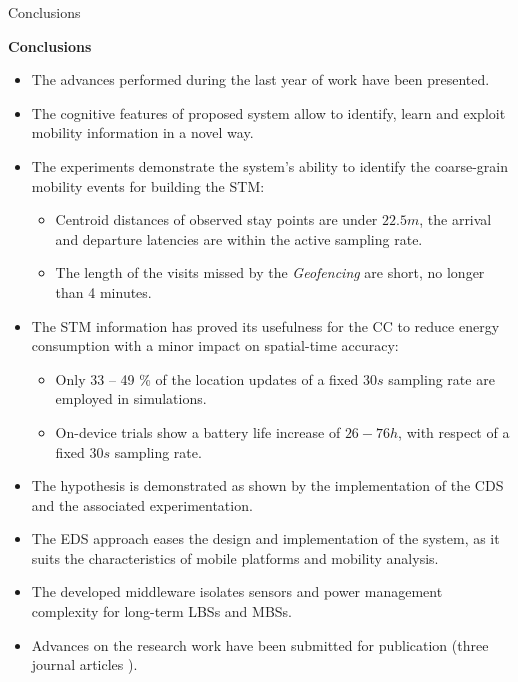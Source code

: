 \begin{frame}{Conclusions}{}
\small 
\begin{block}{\small \textbf{Conclusions}}
\begin{itemize}
  \item The advances performed during the last year of work have been presented.
  \item The cognitive features of proposed system allow to identify, learn and exploit mobility information in a novel way.

  \item The experiments demonstrate the system's ability to identify the coarse-grain mobility events for building the STM:
  \begin{itemize}
  	\item Centroid distances of observed stay points are under $22.5 m$, the arrival and departure latencies are within the active sampling rate.
  	\item The length of the visits missed by the \emph{Geofencing} are short, no longer than 4 minutes.
  \end{itemize}
  
  \item The STM information has proved its usefulness for the CC to reduce energy consumption with a minor impact on spatial-time accuracy: 
  \begin{itemize}
  	\item Only 33 – 49 \% of the location updates of a fixed $30 s$ sampling rate are employed in simulations.
  	\item On-device trials show a battery life increase of $26 - 76 h$, with respect of a fixed $30 s$ sampling rate.
  \end{itemize}

  \item The hypothesis is demonstrated as shown by the implementation of the CDS and the associated experimentation. 
  \item The EDS approach eases the design and implementation of the system, as it suits the characteristics of mobile platforms and mobility analysis. 
  \item The developed middleware isolates sensors and power management complexity for long-term LBSs and MBSs.
  \item Advances on the research work have been submitted for publication (three journal articles \cite{Perez-Torres2016,Perez-Torres2016b,Perez-Torres2018}).
\end{itemize}
\end{block}
\end{frame}